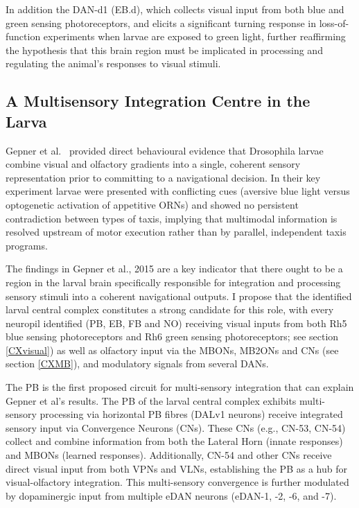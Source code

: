         In addition the DAN-d1 (EB.d), which collects visual input from both blue and green sensing photoreceptors,  and elicits a significant turning response in loss-of-function experiments when larvae are exposed to green light, further reaffirming the hypothesis that this brain region must be implicated in processing and regulating the animal's responses to visual stimuli. 

        \subsection{A Multisensory Integration Centre in the Larva}
        \label{multisensory integration}
        Gepner et al.\ \citep{gepner2015computations} provided direct behavioural evidence that Drosophila larvae combine visual and olfactory gradients into a single, coherent sensory representation prior to committing to a navigational decision. In their key experiment larvae were presented with conflicting cues (aversive blue light versus optogenetic activation of appetitive ORNs) and showed no persistent contradiction between types of taxis, implying that multimodal information is resolved upstream of motor execution rather than by parallel, independent taxis programs.

        The findings in Gepner et al., 2015 are a key indicator that there ought to be a region in the larval brain specifically responsible for integration and processing sensory stimuli into a coherent navigational outputs. 
        I propose that the identified larval central complex constitutes a strong candidate for this role, with every neuropil identified (PB, EB, FB and NO) receiving visual inputs from both Rh5 blue sensing photoreceptors and Rh6 green sensing photoreceptors; see section \ref{CXvisual}) as well as olfactory input via the MBONs, MB2ONs and CNs (see section \ref{CXMB}), and modulatory signals from several DANs. 

        The PB is the first proposed circuit for multi-sensory integration that can explain Gepner et al’s results. The PB of the larval central complex exhibits multi-sensory processing via horizontal PB fibres (DALv1 neurons) receive integrated sensory input via Convergence Neurons (CNs). These CNs (e.g., CN-53, CN-54) collect and combine information from both the Lateral Horn (innate responses) and MBONs (learned responses). Additionally, CN-54 and other CNs receive direct visual input from both VPNs and VLNs, establishing the PB as a hub for visual-olfactory integration. This multi-sensory convergence is further modulated by dopaminergic input from multiple eDAN neurons (eDAN-1, -2, -6, and -7).
        

